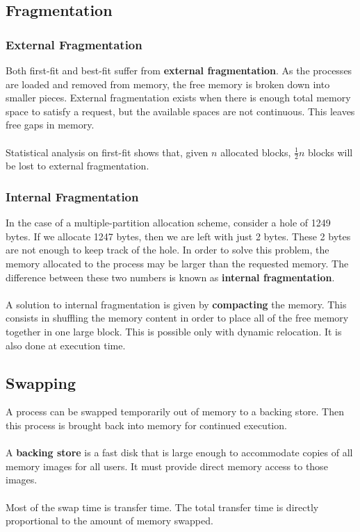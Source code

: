 \documentclass{article}
\begin{document}
\subsection{Fragmentation}
\subsubsection{External Fragmentation}
Both first-fit and best-fit suffer from \textbf{external fragmentation}. As the processes are loaded and removed from memory, the free memory is broken down into smaller pieces. External fragmentation exists when there is enough total memory space to satisfy a request, but the available spaces are not continuous. This leaves free gaps in memory. \\ \\
Statistical analysis on first-fit shows that, given $n$ allocated blocks, $\frac{1}{2}n$ blocks will be lost to external fragmentation.

\subsubsection{Internal Fragmentation}
In the case of a multiple-partition allocation scheme, consider a hole of 1249 bytes. If we allocate 1247 bytes, then we are left with just 2 bytes. These 2 bytes are not enough to keep track of the hole. In order to solve this problem, the memory allocated to the process may be larger than the requested memory. The difference between these two numbers is known as \textbf{internal fragmentation}. \\ \\
A solution to internal fragmentation is given by \textbf{compacting} the memory. This consists in shuffling the memory content in order to place all of the free memory together in one large block. This is possible only with dynamic relocation. It is also done at execution time.

\subsection{Swapping}
A process can be swapped temporarily out of memory to a backing store. Then this process is brought back into memory for continued execution. \\ \\
A \textbf{backing store} is a fast disk that is large enough to accommodate copies of all memory images for all users. It must provide direct memory access to those images. \\ \\
Most of the swap time is transfer time. The total transfer time is directly proportional to the amount of memory swapped.
\end{document}

